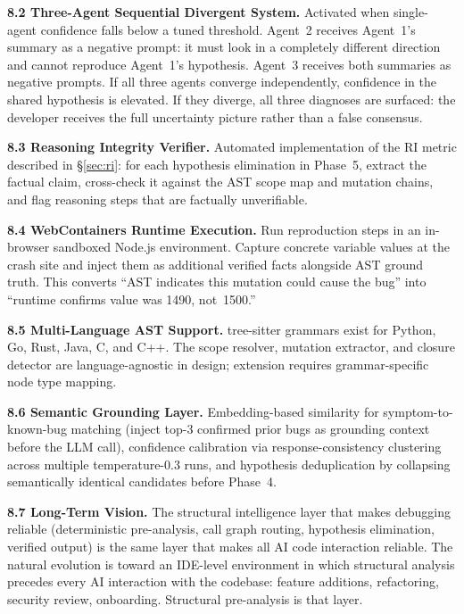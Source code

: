 \documentclass[12pt,a4paper]{article}
\begin{document}
\textbf{8.2 \; Three-Agent Sequential Divergent System.}
Activated when single-agent confidence falls below a tuned threshold. Agent~2 receives
Agent~1's summary as a negative prompt: it must look in a completely different direction
and cannot reproduce Agent~1's hypothesis. Agent~3 receives both summaries as negative
prompts. If all three agents converge independently, confidence in the shared hypothesis
is elevated. If they diverge, all three diagnoses are surfaced: the developer receives the
full uncertainty picture rather than a false consensus.

\textbf{8.3 \; Reasoning Integrity Verifier.}
Automated implementation of the RI metric described in \S\ref{sec:ri}: for each hypothesis
elimination in Phase~5, extract the factual claim, cross-check it against the AST scope
map and mutation chains, and flag reasoning steps that are factually unverifiable.

\textbf{8.4 \; WebContainers Runtime Execution.}
Run reproduction steps in an in-browser sandboxed Node.js environment. Capture concrete
variable values at the crash site and inject them as additional verified facts alongside
AST ground truth. This converts ``AST indicates this mutation could cause the bug'' into
``runtime confirms value was 1490, not~1500.''

\textbf{8.5 \; Multi-Language AST Support.}
tree-sitter grammars exist for Python, Go, Rust, Java, C, and C++. The scope resolver,
mutation extractor, and closure detector are language-agnostic in design; extension
requires grammar-specific node type mapping.

\textbf{8.6 \; Semantic Grounding Layer.}
Embedding-based similarity for symptom-to-known-bug matching (inject top-3 confirmed
prior bugs as grounding context before the LLM call), confidence calibration via
response-consistency clustering across multiple temperature-$0.3$ runs, and hypothesis
deduplication by collapsing semantically identical candidates before Phase~4.

\textbf{8.7 \; Long-Term Vision.}
The structural intelligence layer that makes debugging reliable (deterministic
pre-analysis, call graph routing, hypothesis elimination, verified output) is the same
layer that makes all AI code interaction reliable. The natural evolution is toward an
IDE-level environment in which structural analysis precedes every AI interaction with
the codebase: feature additions, refactoring, security review, onboarding. Structural
pre-analysis is that layer.
\end{document}
